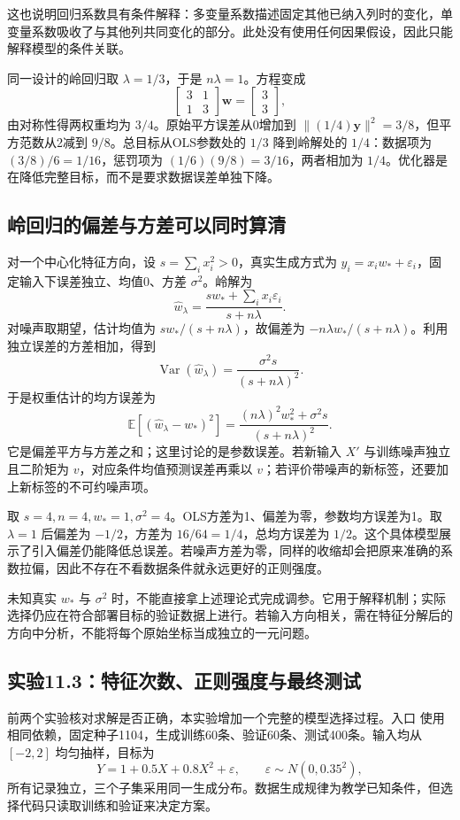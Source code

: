\documentclass[UTF8,fontset=none,zihao=-4,a4paper]{ctexart}
\newcommand{\code}[1]{\texttt{\detokenize{#1}}}
\numberwithin{equation}{section}
\numberwithin{figure}{section}
\begin{document}
这也说明回归系数具有条件解释：多变量系数描述固定其他已纳入列时的变化，单变量系数吸收了与其他列共同变化的部分。此处没有使用任何因果假设，因此只能解释模型的条件关联。

同一设计的岭回归取 $\lambda=1/3$，于是 $n\lambda=1$。方程变成
\[
 \begin{bmatrix}3&1\\1&3\end{bmatrix}\symbf w
 =\begin{bmatrix}3\\3\end{bmatrix},
\]
由对称性得两权重均为 $3/4$。原始平方误差从0增加到 $\|(1/4)\symbf y\|^2=3/8$，但平方范数从2减到 $9/8$。总目标从OLS参数处的 $1/3$ 降到岭解处的 $1/4$：数据项为 $(3/8)/6=1/16$，惩罚项为 $(1/6)(9/8)=3/16$，两者相加为 $1/4$。优化器是在降低完整目标，而不是要求数据误差单独下降。

\subsection{岭回归的偏差与方差可以同时算清}
对一个中心化特征方向，设 $s=\sum_i x_i^2>0$，真实生成方式为 $y_i=x_iw_*+\varepsilon_i$，固定输入下误差独立、均值0、方差 $\sigma^2$。岭解为
\[
 \widehat w_\lambda=\frac{sw_*+\sum_i x_i\varepsilon_i}{s+n\lambda}.
\]
对噪声取期望，估计均值为 $sw_* /(s+n\lambda)$，故偏差为 $-n\lambda w_* /(s+n\lambda)$。利用独立误差的方差相加，得到
\[
 \operatorname{Var}(\widehat w_\lambda)
 =\frac{\sigma^2s}{(s+n\lambda)^2}.
\]
于是权重估计的均方误差为
\begin{equation}
 \mathbb E[(\widehat w_\lambda-w_*)^2]
 =\frac{(n\lambda)^2w_*^2+\sigma^2s}{(s+n\lambda)^2}.
\end{equation}
它是偏差平方与方差之和；这里讨论的是参数误差。若新输入 $X'$ 与训练噪声独立且二阶矩为 $v$，对应条件均值预测误差再乘以 $v$；若评价带噪声的新标签，还要加上新标签的不可约噪声项。

取 $s=4,n=4,w_*=1,\sigma^2=4$。OLS方差为1、偏差为零，参数均方误差为1。取 $\lambda=1$ 后偏差为 $-1/2$，方差为 $16/64=1/4$，总均方误差为 $1/2$。这个具体模型展示了引入偏差仍能降低总误差。若噪声方差为零，同样的收缩却会把原来准确的系数拉偏，因此不存在不看数据条件就永远更好的正则强度。

未知真实 $w_*$ 与 $\sigma^2$ 时，不能直接拿上述理论式完成调参。它用于解释机制；实际选择仍应在符合部署目标的验证数据上进行。若输入方向相关，需在特征分解后的方向中分析，不能将每个原始坐标当成独立的一元问题。

\subsection{实验11.3：特征次数、正则强度与最终测试}
前两个实验核对求解是否正确，本实验增加一个完整的模型选择过程。入口 \code{ch11_selection.py} 使用相同依赖，固定种子1104，生成训练60条、验证60条、测试400条。输入均从 $[-2,2]$ 均匀抽样，目标为
\[
 Y=1+0.5X+0.8X^2+\varepsilon,\qquad \varepsilon\sim N(0,0.35^2),
\]
所有记录独立，三个子集采用同一生成分布。数据生成规律为教学已知条件，但选择代码只读取训练和验证来决定方案。
\end{document}
